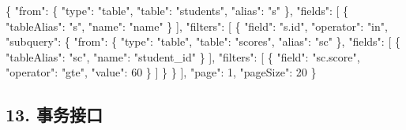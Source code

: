\documentclass[
  a4paper,
  UTF8]{ctexart}
\newenvironment{Shaded}{}{}
\newcommand{\DataTypeTok}[1]{\textcolor[rgb]{0.56,0.13,0.00}{#1}}
\newcommand{\DecValTok}[1]{\textcolor[rgb]{0.25,0.63,0.44}{#1}}
\newcommand{\FunctionTok}[1]{\textcolor[rgb]{0.02,0.16,0.49}{#1}}
\newcommand{\OtherTok}[1]{\textcolor[rgb]{0.00,0.44,0.13}{#1}}
\newcommand{\StringTok}[1]{\textcolor[rgb]{0.25,0.44,0.63}{#1}}
\begin{document}
\begin{Shaded}
\begin{Highlighting}[]
\FunctionTok{\{}
  \DataTypeTok{"from"}\FunctionTok{:} \FunctionTok{\{}
    \DataTypeTok{"type"}\FunctionTok{:} \StringTok{"table"}\FunctionTok{,}
    \DataTypeTok{"table"}\FunctionTok{:} \StringTok{"students"}\FunctionTok{,}
    \DataTypeTok{"alias"}\FunctionTok{:} \StringTok{"s"}
  \FunctionTok{\},}
  \DataTypeTok{"fields"}\FunctionTok{:} \OtherTok{[}
    \FunctionTok{\{}
      \DataTypeTok{"tableAlias"}\FunctionTok{:} \StringTok{"s"}\FunctionTok{,}
      \DataTypeTok{"name"}\FunctionTok{:} \StringTok{"name"}
    \FunctionTok{\}}
  \OtherTok{]}\FunctionTok{,}
  \DataTypeTok{"filters"}\FunctionTok{:} \OtherTok{[}
    \FunctionTok{\{}
      \DataTypeTok{"field"}\FunctionTok{:} \StringTok{"s.id"}\FunctionTok{,}
      \DataTypeTok{"operator"}\FunctionTok{:} \StringTok{"in"}\FunctionTok{,}
      \DataTypeTok{"subquery"}\FunctionTok{:} \FunctionTok{\{}
        \DataTypeTok{"from"}\FunctionTok{:} \FunctionTok{\{}
          \DataTypeTok{"type"}\FunctionTok{:} \StringTok{"table"}\FunctionTok{,}
          \DataTypeTok{"table"}\FunctionTok{:} \StringTok{"scores"}\FunctionTok{,}
          \DataTypeTok{"alias"}\FunctionTok{:} \StringTok{"sc"}
        \FunctionTok{\},}
        \DataTypeTok{"fields"}\FunctionTok{:} \OtherTok{[}
          \FunctionTok{\{}
            \DataTypeTok{"tableAlias"}\FunctionTok{:} \StringTok{"sc"}\FunctionTok{,}
            \DataTypeTok{"name"}\FunctionTok{:} \StringTok{"student\_id"}
          \FunctionTok{\}}
        \OtherTok{]}\FunctionTok{,}
        \DataTypeTok{"filters"}\FunctionTok{:} \OtherTok{[}
          \FunctionTok{\{}
            \DataTypeTok{"field"}\FunctionTok{:} \StringTok{"sc.score"}\FunctionTok{,}
            \DataTypeTok{"operator"}\FunctionTok{:} \StringTok{"gte"}\FunctionTok{,}
            \DataTypeTok{"value"}\FunctionTok{:} \DecValTok{60}
          \FunctionTok{\}}
        \OtherTok{]}
      \FunctionTok{\}}
    \FunctionTok{\}}
  \OtherTok{]}\FunctionTok{,}
  \DataTypeTok{"page"}\FunctionTok{:} \DecValTok{1}\FunctionTok{,}
  \DataTypeTok{"pageSize"}\FunctionTok{:} \DecValTok{20}
\FunctionTok{\}}
\end{Highlighting}
\end{Shaded}

\hypertarget{ux4e8bux52a1ux63a5ux53e3}{%
\subsection{13. 事务接口}\label{ux4e8bux52a1ux63a5ux53e3}}
\end{document}
